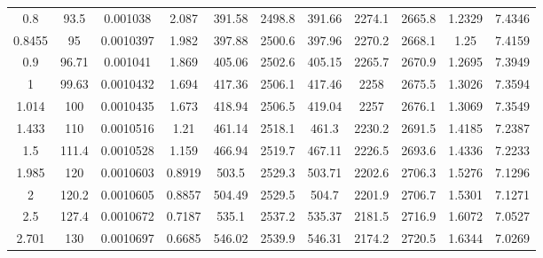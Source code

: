 \begin{longtable}{ccccccccccc}
0.8      & 93.5        & 0.001038               & 2.087               & 391.58                 & 2498.8              & 391.66          & 2274.1       & 2665.8       & 1.2329         & 7.4346      \\
0.8455   & 95          & 0.0010397              & 1.982               & 397.88                 & 2500.6              & 397.96          & 2270.2       & 2668.1       & 1.25           & 7.4159      \\
0.9      & 96.71       & 0.001041               & 1.869               & 405.06                 & 2502.6              & 405.15          & 2265.7       & 2670.9       & 1.2695         & 7.3949      \\
1        & 99.63       & 0.0010432              & 1.694               & 417.36                 & 2506.1              & 417.46          & 2258         & 2675.5       & 1.3026         & 7.3594      \\
1.014    & 100         & 0.0010435              & 1.673               & 418.94                 & 2506.5              & 419.04          & 2257         & 2676.1       & 1.3069         & 7.3549      \\
1.433    & 110         & 0.0010516              & 1.21                & 461.14                 & 2518.1              & 461.3           & 2230.2       & 2691.5       & 1.4185         & 7.2387      \\
1.5      & 111.4       & 0.0010528              & 1.159               & 466.94                 & 2519.7              & 467.11          & 2226.5       & 2693.6       & 1.4336         & 7.2233      \\
1.985    & 120         & 0.0010603              & 0.8919              & 503.5                  & 2529.3              & 503.71          & 2202.6       & 2706.3       & 1.5276         & 7.1296      \\
2        & 120.2       & 0.0010605              & 0.8857              & 504.49                 & 2529.5              & 504.7           & 2201.9       & 2706.7       & 1.5301         & 7.1271      \\
2.5      & 127.4       & 0.0010672              & 0.7187              & 535.1                  & 2537.2              & 535.37          & 2181.5       & 2716.9       & 1.6072         & 7.0527      \\
2.701    & 130         & 0.0010697              & 0.6685              & 546.02                 & 2539.9              & 546.31          & 2174.2       & 2720.5       & 1.6344         & 7.0269      \\

\end{longtable}
